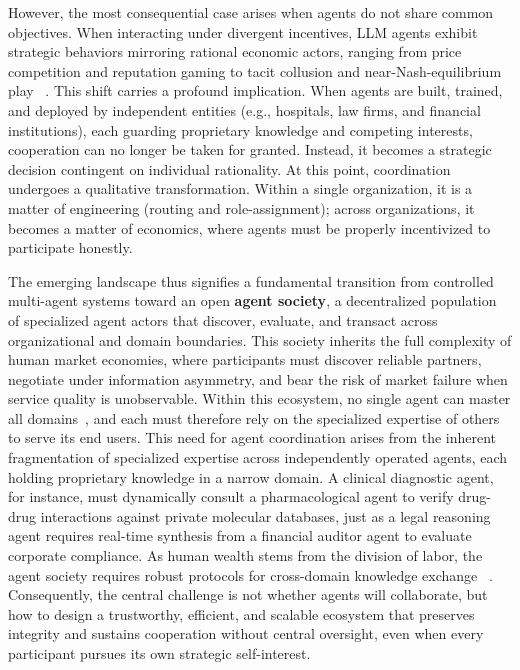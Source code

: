 However, the most consequential case arises when agents do not share common objectives. When interacting under divergent incentives, LLM agents exhibit strategic behaviors mirroring rational economic actors, ranging from price competition and reputation gaming to tacit collusion and near-Nash-equilibrium play ~\cite{park2023generative, zhao2023competeai, horton2023homo, fish2024collusion, akata2023repeated_games}. This shift carries a profound implication. When agents are built, trained, and deployed by independent entities (e.g., hospitals, law firms, and financial institutions), each guarding proprietary knowledge and competing interests, cooperation can no longer be taken for granted. Instead, it becomes a strategic decision contingent on individual rationality. At this point, coordination undergoes a qualitative transformation. Within a single organization, it is a matter of engineering (routing and role-assignment); across organizations, it becomes a matter of economics, where agents must be properly incentivized to participate honestly.

The emerging landscape thus signifies a fundamental transition from controlled multi-agent systems toward an open \textbf{agent society}, a decentralized population of specialized agent actors that discover, evaluate, and transact across organizational and domain boundaries. This society inherits the full complexity of human market economies, where participants must discover reliable partners, negotiate under information asymmetry, and bear the risk of market failure when service quality is unobservable. Within this ecosystem, no single agent can master all domains~\cite{guo2024large}, and each must therefore rely on the specialized expertise of others to serve its end users. This need for agent coordination arises from the inherent fragmentation of specialized expertise across independently operated agents, each holding proprietary knowledge in a narrow domain. A clinical diagnostic agent, for instance, must dynamically consult a pharmacological agent to verify drug-drug interactions against private molecular databases, just as a legal reasoning agent requires real-time synthesis from a financial auditor agent to evaluate corporate compliance. As human wealth stems from the division of labor, the agent society requires robust protocols for cross-domain knowledge exchange ~\cite{hayek1945use}. Consequently, the central challenge is not whether agents will collaborate, but how to design a trustworthy, efficient, and scalable ecosystem that preserves integrity and sustains cooperation without central oversight, even when every participant pursues its own strategic self-interest.



